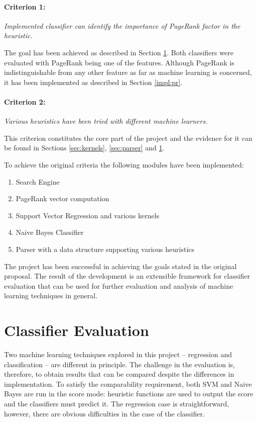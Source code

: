\documentclass[12pt,a4paper,notitlepage,twoside]{scrbook}
\begin{document}
\paragraph{Criterion 1:}\textit{Implemented classifier can identify the importance of
PageRank factor in the heuristic.}

The goal has been achieved as described in Section \ref{sec:eval_class}. Both classifiers were
evaluated with PageRank being one of the features. Although PageRank is indistinguishable
from any other feature as far as machine learning is concerned, it has been implemented as
described in Section \ref{impl:pr}.

\paragraph{Criterion 2:}\textit{Various heuristics have been tried with different machine
learners.}

This criterion constitutes the core part of the project and the evidence for it can be
found in Sections \ref{sec:kernels}, \ref{sec:parser} and \ref{sec:eval_class}.

To achieve the original criteria the following modules have been implemented:
\begin{enumerate}
	\item Search Engine
	\item PageRank vector computation
	\item Support Vector Regression and various kernels 
	\item Naive Bayes Classifier
	\item Parser with a data structure supporting various heuristics
\end{enumerate}

The project has been successful in achieving the goals stated in the original proposal.
The result of the development is an extensible framework for classifier evaluation that
can be used for further evaluation and analysis of machine learning techniques in general.
\section{Classifier Evaluation}
\label{sec:eval_class}
Two machine learning techniques explored in this project -- regression and classification
-- are different in principle. The challenge in the evaluation is, therefore, to obtain
results that can be compared despite the differences in implementation. To satisfy the
comparability requirement, both SVM and Naive Bayes are run in the score mode: heuristic
functions are used to output the score and the classifiers must predict it. The
regression case is straightforward, however, there are obvious difficulties in the case of
the classifier. 
\end{document}
